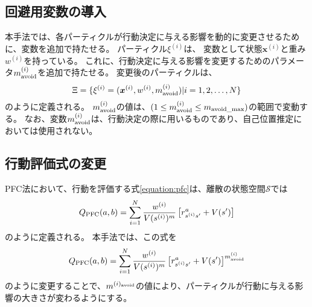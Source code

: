 \subsection{回避用変数の導入}
本手法では、各パーティクルが行動決定に与える影響を動的に変更させるために、変数を追加で持たせる。
パーティクル$\xi^{(i)}$は、 変数として状態$\bm{x}^{(i)}$と重み$w^{(i)}$を持っている。
これに、行動決定に与える影響を変更するためのパラメータ$m^{(i)}_{\rm avoid}$を追加で持たせる。
変更後のパーティクルは、
\begin{equation}
\label{particles}
  \Xi = \{ \xi^{(i)} =
               (\bm{x}^{(i)}, w^{(i)}, m^{(i)}_{\rm avoid}) |i = 1,2,\dots,N \}
\end{equation}
のように定義される。
$m^{(i)}_{\rm avoid}$の値は、$(1 \leq m^{(i)}_{\rm avoid} \leq m_{\rm avoid\_max})$の範囲で変動する。
なお、変数$m^{(i)}_{\rm avoid}$は、行動決定の際に用いるものであり、自己位置推定においては使用されない。

\subsection{行動評価式の変更}
PFC法において、行動を評価する式\ref{equation:pfc}は、離散の状態空間$\mathcal{S}$では
\begin{equation}
\label{equation:finite pfc}
  Q_{\rm PFC}(a, b) = \sum_{i=1}^{N} \frac{ w^{(i)} }{ V(s^{(i)})^{m} }
                      \left[r^{a}_{s^{(i)} s^{\prime}} + V(s^{\prime}) \right]
\end{equation}
のように定義される。
本手法では、この式を
\begin{equation}
\label{equation:modified pfc}
  Q_{\rm PFC}(a, b) = \sum_{i=1}^{N} \frac{ w^{(i)} }{ V(s^{(i)})^{m} }
                      \left[r^{a}_{s^{(i)} s^{\prime}}
                            + V(s^{\prime}) \right] ^{m^{(i)}_{\rm avoid}}
\end{equation}
のように変更することで、$m^{(i)_{\rm avoid}}$の値により、パーティクルが行動に与える影響の大きさが変わるようにする。

